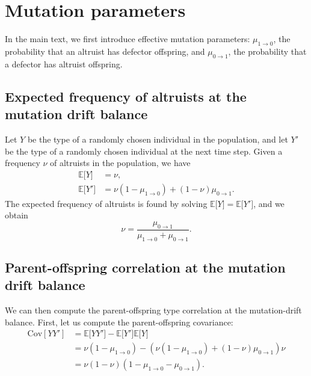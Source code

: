 \documentclass[11pt, letterpaper]{article}
\newcommand{\Esp}[1]{\mathbb{E}\big[ #1\big]}%
\newcommand{\mutbias}{\nu}
\newcommand{\Cov}[1]{\mathrm{Cov}\left[#1 \right]}
\begin{document}
\pagestyle{appendix}


\section{Mutation parameters\label{sec:app:mutation}}

In the main text, we first introduce effective mutation parameters: $\mu_{1\to 0}$, the probability that an altruist has defector offspring, and $\mu_{0\to 1}$, the probability that a defector has altruist offspring. 

\subsection{Expected frequency of altruists at the mutation drift balance}
Let $Y$ be the type of a randomly chosen individual  in the population, and let $Y'$ be the type of a randomly chosen individual at the next time step. Given a frequency $\mutbias$ of altruists in the population, we have
\begin{subequations}
\begin{align}
\Esp{Y} &= \mutbias,\\
\Esp{Y'} &= \mutbias (1-\mu_{1\to 0}) + (1-\mutbias) \mu_{0\to 1}.
\end{align}
\end{subequations}
The expected frequency of altruists is found by solving $\Esp{Y} = \Esp{Y'}$, and we obtain
\begin{equation}
\mutbias = \frac{\mu_{0\to 1}}{\mu_{1\to 0 }+\mu_{0\to 1}}. \label{eq:app:nuformula}
\end{equation}

\subsection{Parent-offspring correlation at the mutation drift balance}

We can then compute the parent-offspring type correlation at the mutation-drift balance. First, let us compute the parent-offspring covariance:
%
\begin{equation}\label{eq:app:Cov}
\begin{aligned}
\Cov{Y Y'} &= \Esp{Y Y'} - \Esp{Y'}\Esp{Y}\\
& = \mutbias (1-\mu_{1\to 0}) - (\mutbias (1-\mu_{1\to 0}) + (1-\mutbias) \mu_{0\to 1}) \mutbias \\
%
& = \mutbias (1-\mutbias) (1 - \mu_{1\to 0} - \mu_{0\to 1}).
\end{aligned}
\end{equation}
\end{document}
